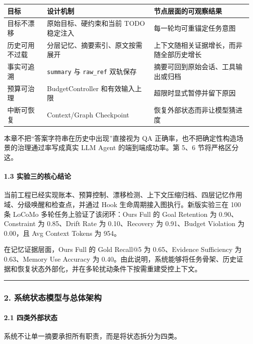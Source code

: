 \documentclass[UTF8,a4paper,12pt]{ctexart}
\begin{document}
\begin{longtable}[]{@{}lll@{}}
\toprule
目标 & 设计机制 & 节点层面的可观察结果 \\
\midrule
\endhead
目标不漂移 & 原始目标、硬约束和当前 TODO 稳定注入 & 每一轮均可重锚定任务意图 \\
历史可用不过载 & 分层记忆、摘要索引、原文按需展开 & 上下文随相关证据增长，而非随全部历史增长 \\
事实可追溯 & \texttt{summary} 与 \texttt{raw\_ref} 双轨保存 & 摘要可回到原始会话、工具输出或归档 \\
预算可治理 & BudgetController 和有效输入上限 & 超限时显式暂停并留下原因 \\
中断可恢复 & Context/Graph Checkpoint & 恢复外部状态而非让模型猜进度 \\
\bottomrule
\end{longtable}

本章不把``答案字符串在历史中出现''直接视为 QA 正确率，也不把确定性构造场景的治理通过率写成真实 LLM Agent 的端到端成功率。第 5、6 节将严格区分这。

\paragraph{1.3 实验三的核心结论}

当前工程已经实现账本、预算控制、漂移检测、上下文压缩归档、四层记忆作用域、分级唤醒和检查点，并通过 Hook 生命周期接入图执行。新版实验三在 100 条 LoCoMo 多轮任务上验证了该闭环：Ours Full 的 Goal Retention 为 0.90、Constraint 为 0.85、Drift Rate 为 0.10、Recovery 为 0.91、Budget Violation 为 0.00，且 Avg Context Tokens 为 954。

在记忆证据层面，Ours Full 的 Gold Recall@5 为 0.65、Evidence Sufficiency 为 0.63、Memory Use Accuracy 为 0.40。由此说明，系统能够将任务骨架、历史证据和恢复状态外部化，并在多轮扰动条件下按需重建受控上下文。

\begin{center}\rule{0.5\linewidth}{0.5pt}\end{center}

\subsubsection{2. 系统状态模型与总体架构}

\paragraph{2.1 四类外部状态}

系统不让单一摘要承担所有职责，而是将状态拆分为四类。
\end{document}
